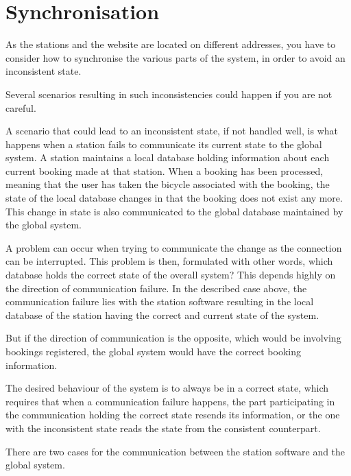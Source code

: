 \section{Synchronisation}\label{sec:sync}
As the stations and the website are located on different addresses, you have to consider how to synchronise the various parts of the system, in order to avoid an inconsistent state.

Several scenarios resulting in such inconsistencies could happen if you are not careful.

A scenario that could lead to an inconsistent state, if not handled well, is what happens when a station fails to communicate its current state to the global system.
A station maintains a local database holding information about each current booking made at that station.
When a booking has been processed, meaning that the user has taken the bicycle associated with the booking, the state of the local database changes in that the booking does not exist any more.
This change in state is also communicated to the global database maintained by the global system.

A problem can occur when trying to communicate the change as the connection can be interrupted.
This problem is then, formulated with other words, which database holds the correct state of the overall system?
This depends highly on the direction of communication failure. 
In the described case above, the communication failure lies with the station software resulting in the local database of the station having the correct and current state of the system.

But if the direction of communication is the opposite, which would be involving bookings registered, the global system would have the correct booking information.

The desired behaviour of the system is to always be in a correct state, which requires that when a communication failure happens, the part participating in the communication holding the correct state resends its information, or the one with the inconsistent state reads the state from the consistent counterpart.

There are two cases for the communication between the station software and the global system.


